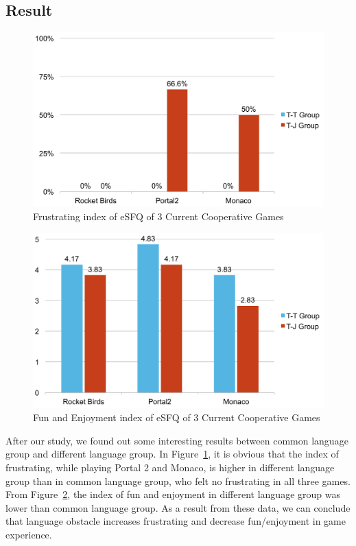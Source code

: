 \subsection{Result}

\begin{figure}[!h]
\centering
\includegraphics[width=0.9\columnwidth]{Figures/PS_Frus.pdf}
\caption{Frustrating index of eSFQ of 3 Current Cooperative Games}
\label{fig:PS_Frus}
\end{figure}

\begin{figure}[!h]
\centering
\includegraphics[width=0.9\columnwidth]{Figures/PS_FunAndEnj.pdf}
\caption{Fun and Enjoyment index of eSFQ of 3 Current Cooperative Games}
\label{fig:PS_FunAndEnj}
\end{figure}


After our study, we found out some interesting results between common language group and different language group. In Figure~\ref{fig:PS_Frus}, it is obvious that the index of frustrating, while playing Portal 2 and Monaco, is higher in different language group than in common language group, who felt no frustrating in all three games. From Figure~\ref{fig:PS_FunAndEnj}, the index of fun and enjoyment in different language group was lower than common language group. As a result from these data, we can conclude that language obstacle increases frustrating and decrease fun/enjoyment in game experience.


